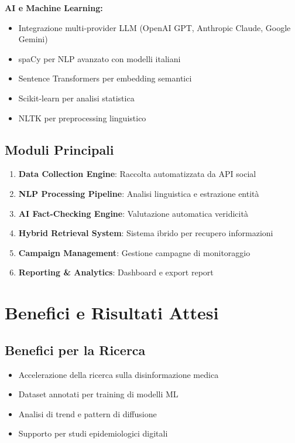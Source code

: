 \documentclass[12pt,a4paper]{report}
\begin{document}
\textbf{AI e Machine Learning:}
\begin{itemize}
    \item Integrazione multi-provider LLM (OpenAI GPT, Anthropic Claude, Google Gemini)
    \item spaCy per NLP avanzato con modelli italiani
    \item Sentence Transformers per embedding semantici
    \item Scikit-learn per analisi statistica
    \item NLTK per preprocessing linguistico
\end{itemize}

\subsection{Moduli Principali}

\begin{enumerate}
    \item \textbf{Data Collection Engine}: Raccolta automatizzata da API social
    \item \textbf{NLP Processing Pipeline}: Analisi linguistica e estrazione entità
    \item \textbf{AI Fact-Checking Engine}: Valutazione automatica veridicità
    \item \textbf{Hybrid Retrieval System}: Sistema ibrido per recupero informazioni
    \item \textbf{Campaign Management}: Gestione campagne di monitoraggio
    \item \textbf{Reporting & Analytics}: Dashboard e export report
\end{enumerate}

\section{Benefici e Risultati Attesi}

\subsection{Benefici per la Ricerca}
\begin{itemize}
    \item Accelerazione della ricerca sulla disinformazione medica
    \item Dataset annotati per training di modelli ML
    \item Analisi di trend e pattern di diffusione
    \item Supporto per studi epidemiologici digitali
\end{itemize}
\end{document}
